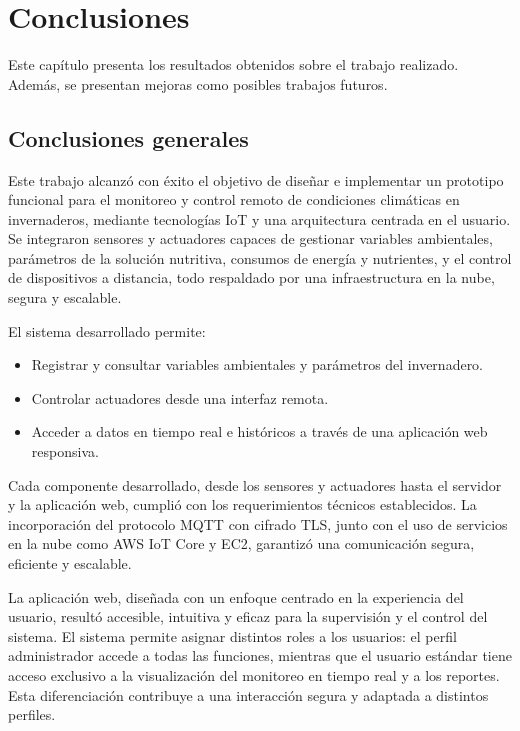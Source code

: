 \chapter{Conclusiones} %

\label{Chapter5}

Este capítulo presenta los resultados obtenidos sobre el trabajo realizado.
Además, se presentan mejoras como posibles trabajos futuros.



\section{Conclusiones generales}

Este trabajo alcanzó con éxito el objetivo de diseñar e implementar un
prototipo funcional para el monitoreo y control remoto de condiciones
climáticas en invernaderos, mediante tecnologías IoT y una arquitectura
centrada en el usuario. Se integraron sensores y actuadores capaces de
gestionar variables ambientales, parámetros de la solución nutritiva, consumos
de energía y nutrientes, y el control de dispositivos a distancia, todo
respaldado por una infraestructura en la nube, segura y escalable.

El sistema desarrollado permite:
\begin{itemize}
    \item Registrar y consultar variables ambientales y parámetros del invernadero.
    \item Controlar actuadores desde una interfaz remota.
    \item Acceder a datos en tiempo real e históricos a través de una aplicación web
          responsiva.
\end{itemize}

Cada componente desarrollado, desde los sensores y actuadores hasta el servidor
y la aplicación web, cumplió con los requerimientos técnicos establecidos. La
incorporación del protocolo MQTT con cifrado TLS, junto con el uso de servicios
en la nube como AWS IoT Core y EC2, garantizó una comunicación segura,
eficiente y escalable.

La aplicación web, diseñada con un enfoque centrado en la experiencia del
usuario, resultó accesible, intuitiva y eficaz para la supervisión y el control
del sistema. El sistema permite asignar distintos roles a los usuarios: el
perfil administrador accede a todas las funciones, mientras que el usuario
estándar tiene acceso exclusivo a la visualización del monitoreo en tiempo real
y a los reportes. Esta diferenciación contribuye a una interacción segura y
adaptada a distintos perfiles.

